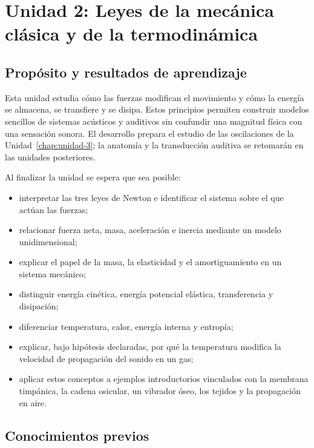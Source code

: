 \chapter{Unidad 2: Leyes de la mecánica clásica y de la termodinámica}
\label{chap:unidad-2}

\section{Propósito y resultados de aprendizaje}
\label{sec:u2-proposito}

Esta unidad estudia cómo las fuerzas modifican el movimiento y cómo la energía se almacena, se transfiere y se disipa. Estos principios permiten construir modelos sencillos de sistemas acústicos y auditivos sin confundir una magnitud física con una sensación sonora. El desarrollo prepara el estudio de las oscilaciones de la Unidad~\ref{chap:unidad-3}; la anatomía y la transducción auditiva se retomarán en las unidades posteriores.

Al finalizar la unidad se espera que sea posible:

\begin{itemize}
    \item interpretar las tres leyes de Newton e identificar el sistema sobre el que actúan las fuerzas;
    \item relacionar fuerza neta, masa, aceleración e inercia mediante un modelo unidimensional;
    \item explicar el papel de la masa, la elasticidad y el amortiguamiento en un sistema mecánico;
    \item distinguir energía cinética, energía potencial elástica, transferencia y disipación;
    \item diferenciar temperatura, calor, energía interna y entropía;
    \item explicar, bajo hipótesis declaradas, por qué la temperatura modifica la velocidad de propagación del sonido en un gas;
    \item aplicar estos conceptos a ejemplos introductorios vinculados con la membrana timpánica, la cadena osicular, un vibrador óseo, los tejidos y la propagación en aire.
\end{itemize}

\section{Conocimientos previos}
\label{sec:u2-previos}

